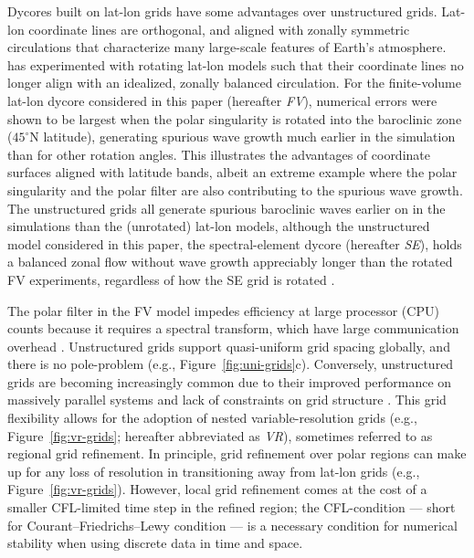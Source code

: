 \documentclass[draft]{agujournal2019}
\begin{document}
Dycores built on lat-lon grids have some advantages over unstructured grids. Lat-lon coordinate lines are orthogonal, and aligned with zonally symmetric circulations that characterize many large-scale features of Earth's atmosphere.  has experimented with rotating lat-lon models such that their coordinate lines no longer align with an idealized, zonally balanced circulation. For the finite-volume lat-lon dycore considered in this paper (hereafter \textit{FV}), numerical errors were shown to be largest when the polar singularity is rotated into the baroclinic zone ($45^{\circ}$N latitude), generating spurious wave growth much earlier in the simulation than for other rotation angles. This illustrates the advantages of coordinate surfaces aligned with latitude bands, albeit an extreme example where the polar singularity and the polar filter are also contributing to the spurious wave growth. The unstructured grids all generate spurious baroclinic waves earlier on in the simulations than the (unrotated) lat-lon models, although the unstructured model considered in this paper, the spectral-element dycore (hereafter \textit{SE}), holds a balanced zonal flow without wave growth appreciably longer than the rotated FV experiments, regardless of how the SE grid is rotated \cite{LJTN2010JAMES}. {\color{purple}{Marcus - this sentence is very complicating.}}

The polar filter in the FV model impedes efficiency at large processor (CPU) counts because it requires a spectral transform, which have large communication overhead \cite{ST1995GEOS,DetAl2012IJHPCA}. Unstructured grids support quasi-uniform grid spacing globally, and there is no pole-problem (e.g., Figure~\ref{fig:uni-grids}c). Conversely, unstructured grids are becoming increasingly common due to their improved performance on massively parallel systems and lack of constraints on grid structure \cite{PL2007JCP,DetAl2012IJHPCA,WETAL2013GMD}. This grid flexibility allows for the adoption of nested variable-resolution grids (e.g., Figure~\ref{fig:vr-grids}; hereafter abbreviated as \textit{VR}), sometimes referred to as regional grid refinement. In principle, grid refinement over polar regions can make up for any loss of resolution in transitioning away from lat-lon grids (e.g., Figure~\ref{fig:vr-grids}).  However, local grid refinement comes at the cost of a smaller CFL-limited time step in the refined region; the CFL-condition --- short for Courant–Friedrichs–Lewy condition --- is a necessary condition for numerical stability when using discrete data in time and space.
\end{document}
